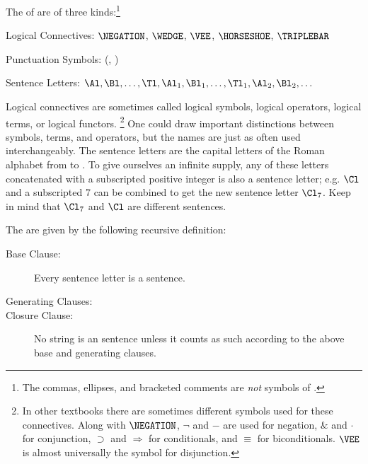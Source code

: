 \begin{majorILnc}{} The  of \GSL{} are of three kinds:\footnote{The commas, ellipses, and bracketed comments are \emph{not} symbols of \GSL{}.}
\begin{cenumerate}
\item Logical Connectives: $\NEGATION$, $\WEDGE$, $\VEE$, $\HORSESHOE$, $\TRIPLEBAR$
\item Punctuation Symbols: (, )
\item Sentence Letters: $\Al,\Bl, \ldots, \Tl, \Al_1,\Bl_1, \ldots, \Tl_1, \Al_2, \Bl_2, \ldots$  
\end{cenumerate}
\end{majorILnc} 
\noindent{}Logical connectives are sometimes called logical symbols, logical operators, logical terms, or logical functors.%
\footnote{%
In other textbooks there are sometimes different symbols used for these connectives. 
Along with $\NEGATION$, $\neg$ and $-$ are used for negation, $\&$ and $\cdot$ for conjunction, $\supset$ and $\Rightarrow$ for conditionals, and $\equiv$ for biconditionals. $\VEE$ is almost universally the symbol for disjunction.
} 
One could draw important distinctions between symbols, terms, and operators, but the names are just as often used interchangeably.
The sentence letters are the capital letters of the Roman alphabet from \mention{$\Al$} to \mention{$\Tl$}.  To give ourselves an infinite supply, any of these letters concatenated with a subscripted positive integer is also a sentence letter; e.g. $\Cl$ and a subscripted $7$ can be combined to get the new sentence letter $\Cl_7$. Keep in mind that $\Cl_7$ and $\Cl$ are different sentences.

\begin{majorILnc}{} The   are given by the following recursive definition:
\begin{description}
\item[Base Clause:] Every sentence letter is a sentence.
\item[Generating Clauses:] \hfill
{}
\item[Closure Clause:] No string is an \GSL{} sentence unless it counts as such according to the above base and generating clauses.
\end{description}
\end{majorILnc}

